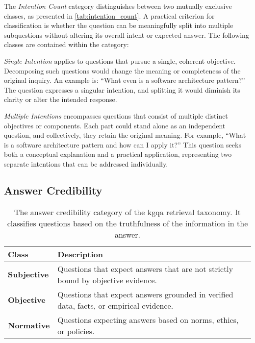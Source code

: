 The \emph{Intention Count} category distinguishes between two mutually exclusive classes, as presented in \autoref{tab:intention_count}. A practical criterion for classification is whether the question can be meaningfully split into multiple subquestions without altering its overall intent or expected answer. The following classes are contained within the category:

\emph{Single Intention} applies to questions that pursue a single, coherent objective. Decomposing such questions would change the meaning or completeness of the original inquiry. An example is: \enquote{What even is a software architecture pattern?} The question expresses a singular intention, and splitting it would diminish its clarity or alter the intended response.

\emph{Multiple Intentions} encompasses questions that consist of multiple distinct objectives or components. Each part could stand alone as an independent question, and collectively, they retain the original meaning. For example, \enquote{What is a software architecture pattern and how can I apply it?} This question seeks both a conceptual explanation and a practical application, representing two separate intentions that can be addressed individually.

\subsection{Answer Credibility}

\begin{table}[t]
    \centering
    \begin{tabular}{@{}lp{8cm}@{}}
        \toprule
        \textbf{Class} & \textbf{Description} \\
        \midrule
            \textbf{Subjective}
            & Questions that expect answers that are not strictly bound by objective evidence. \\
        \cmidrule(l){1-2}
            \textbf{Objective}
            & Questions that expect answers grounded in verified data, facts, or empirical evidence. \\
        \cmidrule(l){1-2}
            \textbf{Normative}
            & Questions expecting answers based on norms, ethics, or policies. \\
        \bottomrule
    \end{tabular}
    \caption[Answer Credibility Category of the Taxonomy]{The answer credibility category of the \gls{kgqa} retrieval taxonomy. It classifies questions based on the truthfulness of the information in the answer.}
    \label{tab:answer_credibility}
\end{table}

